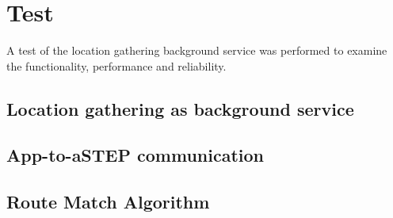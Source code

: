 \section{Test}
A test of the location gathering background service was performed to examine the functionality, performance and reliability.

\subsection{Location gathering as background service}


\subsection{App-to-aSTEP communication}


\subsection{Route Match Algorithm}



